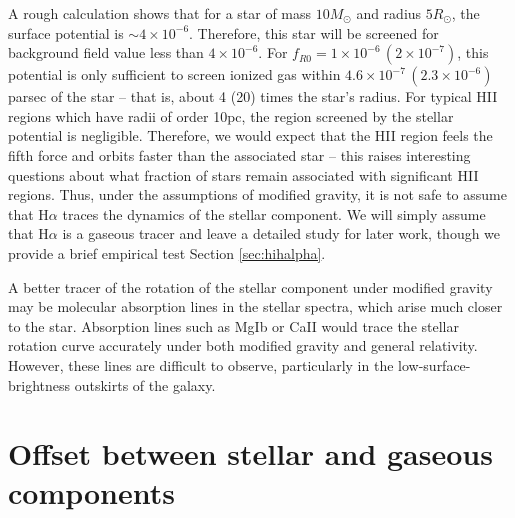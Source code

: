 \documentclass[twocolappendix, numberedappendix]{emulateapj}
\newcommand{\ha}{H$\alpha$}
\begin{document}
A rough calculation shows that for a star of mass $10 M_\odot$ and radius
$5 R_\odot$, the surface potential is $\sim 4\times10^{-6}$. Therefore, this
star will be screened for background field value less than $4\times10^{-6}$.
For $f_{R0} = 1\times10^{-6}\,(2\times10^{-7})$, this potential is only
sufficient to screen ionized gas within
$4.6\times10^{-7}\,(2.3\times10^{-6})$ parsec of the star -- that is, about
4 (20) times the star's radius.
For typical HII regions which have radii of order 10pc, the region screened
by the stellar potential is negligible.  Therefore, we would expect  that the
HII region feels the fifth force and 
orbits faster than the associated star --
this raises interesting questions about what fraction of stars remain
associated with significant HII regions. Thus, under the assumptions of
modified gravity,  it is not safe to assume that \ha{}
traces the dynamics of the stellar component.
We will simply assume that \ha{} is a gaseous tracer and leave 
a detailed study for later work, though we provide a brief empirical
test Section \ref{sec:hihalpha}.

A better tracer of the rotation of the stellar component under modified gravity
may be molecular absorption lines in the stellar spectra, which arise much
closer to the star. Absorption lines such as MgIb or CaII would trace the
stellar rotation curve accurately under both modified gravity and general
relativity. However, these lines are difficult to observe, particularly
in the low-surface-brightness outskirts of the galaxy. 



\section{Offset between stellar and gaseous components}
\label{sec:offset}
\end{document}
